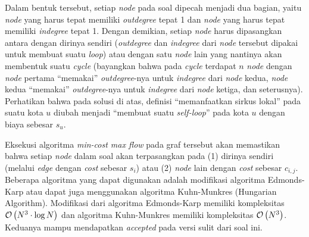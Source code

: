 \documentclass[../main_editorial.tex]{subfiles} %
\begin{document}
\begin{center}
\end{center}

Dalam bentuk tersebut, setiap \textit{node} pada soal dipecah menjadi dua bagian, yaitu \textit{node} yang harus tepat memiliki \textit{outdegree} tepat 1 dan \textit{node} yang harus tepat memiliki \textit{indegree} tepat 1. Dengan demikian, setiap \textit{node} harus dipasangkan antara dengan dirinya sendiri (\textit{outdegree} dan \textit{indegree} dari \textit{node} tersebut dipakai untuk membuat suatu \textit{loop}) atau dengan satu \textit{node} lain yang nantinya akan membentuk suatu \textit{cycle} (bayangkan bahwa pada \textit{cycle} terdapat $ n $ \textit{node} dengan \textit{node} pertama ``memakai'' \textit{outdegree}-nya untuk \textit{indegree} dari \textit{node} kedua, \textit{node} kedua ``memakai'' \textit{outdegree}-nya untuk \textit{indegree} dari \textit{node} ketiga, dan seterusnya). Perhatikan bahwa pada solusi di atas, definisi ``memanfaatkan sirkus lokal'' pada suatu kota $ u $ diubah menjadi ``membuat suatu \textit{self-loop}'' pada kota $ u $ dengan biaya sebesar $ s_u $.

Eksekusi algoritma \textit{min-cost max flow} pada graf tersebut akan memastikan bahwa setiap \textit{node} dalam soal akan terpasangkan pada (1) dirinya sendiri (melalui \textit{edge} dengan \textit{cost} sebesar $ s_i $) atau (2) \textit{node} lain dengan \textit{cost} sebesar $ c_{i, j} $. Beberapa algoritma yang dapat digunakan adalah modifikasi algoritma Edmonds-Karp atau dapat juga menggunakan algoritma Kuhn-Munkres (Hungarian Algorithm). Modifikasi dari algoritma Edmonds-Karp memiliki kompleksitas $ \mathcal{O}\left( N^3\cdot \log{N} \right) $ dan algoritma Kuhn-Munkres memiliki kompleksitas $ \mathcal{O}\left( N^3 \right) $. Keduanya mampu mendapatkan \textit{accepted} pada versi sulit dari soal ini.
\end{document}
